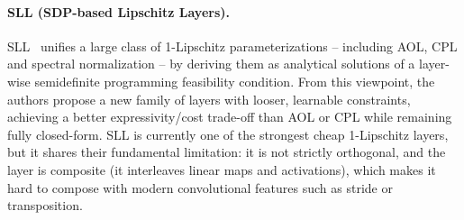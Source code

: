         \paragraph{SLL (SDP-based Lipschitz Layers).}
        SLL~\cite{araujo_unified_2023} unifies a large class of 1-Lipschitz parameterizations -- including AOL, CPL and spectral normalization -- by deriving them as analytical solutions of a layer-wise semidefinite programming feasibility condition. From this viewpoint, the authors propose a new family of layers with looser, learnable constraints, achieving a better expressivity/cost trade-off than AOL or CPL while remaining fully closed-form. SLL is currently one of the strongest cheap 1-Lipschitz layers, but it shares their fundamental limitation: it is not strictly orthogonal, and the layer is composite (it interleaves linear maps and activations), which makes it hard to compose with modern convolutional features such as stride or transposition.